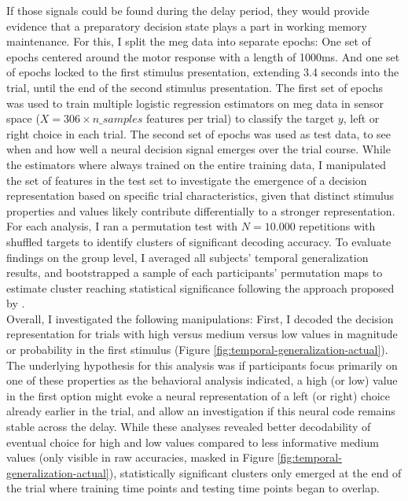 If those signals could be found during the delay period, they would provide evidence that a preparatory decision state plays a part in working memory maintenance.
For this, I split the \gls{meg} data into separate epochs:
One set of epochs centered around the motor response with a length of 1000ms.
And one set of epochs locked to the first stimulus presentation, extending 3.4 seconds into the trial, until the end of the second stimulus presentation.
The first set of epochs was used to train multiple logistic regression estimators on \gls{meg} data in sensor space ($X=306 \times n\_samples$ features per trial) to classify the target $y$, left or right choice in each trial.
The second set of epochs was used as test data, to see when and how well a neural decision signal emerges over the trial course.
While the estimators where always trained on the entire training data, I manipulated the set of features in the test set to investigate the emergence of a decision representation based on specific trial characteristics, given that distinct stimulus properties and values likely contribute differentially to a stronger representation.
For each analysis, I ran a permutation test with $N=10.000$ repetitions with shuffled targets to identify clusters of significant decoding accuracy.
To evaluate findings on the group level, I averaged all subjects' temporal generalization results, and bootstrapped a sample of each participants' permutation maps to estimate cluster reaching statistical significance following the approach proposed by \citet{stelzer2013statistical}.\\
Overall, I investigated the following manipulations:
First, I decoded the decision representation for trials with high versus medium versus low values in magnitude or probability in the first stimulus (Figure \ref{fig:temporal-generalization-actual}).
The underlying hypothesis for this analysis was if participants focus primarily on one of these properties as the behavioral analysis indicated, a high (or low) value in the first option might evoke a neural representation of a left (or right) choice already earlier in the trial, and allow an investigation if this neural code remains stable across the delay.
While these analyses revealed better decodability of eventual choice for high and low values compared to less informative medium values (only visible in raw accuracies, masked in Figure \ref{fig:temporal-generalization-actual}), statistically significant clusters only emerged at the end of the trial where training time points and testing time points began to overlap.
